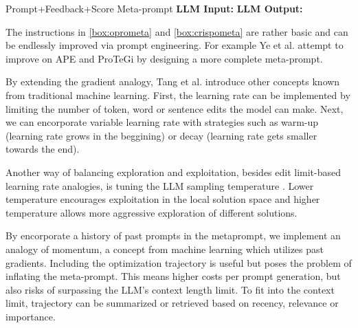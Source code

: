\begin{promptbox}
    [label={box:crispometa}]{Prompt+Feedback+Score Meta-prompt}
    \textbf{LLM Input:} 
    \textbf{LLM Output:} 
\end{promptbox}

The instructions in \ref{box:oprometa} and \ref{box:crispometa} are rather basic and can be endlessly
improved via prompt engineering. For example Ye et al.\cite{ye2024promptengineeringpromptengineer} attempt to 
improve on APE and ProTeGi by designing a more complete meta-prompt. 

By extending the gradient analogy, Tang et al.\cite{tang2024unleashingpotentiallargelanguage} introduce other concepts
known from traditional machine learning. First, the learning rate can be implemented by limiting the number of token, word or sentence edits the model
can make. Next, we can encorporate variable learning rate with strategies such as warm-up (learning rate grows in the beggining) or decay (learning rate
gets smaller towards the end).

Another way of balancing exploration and exploitation, besides edit limit-based learning rate analogies, is tuning the LLM sampling temperature . 
Lower temperature encourages exploitation in the local solution space and higher temperature allows 
more aggressive exploration of different solutions\cite{yang2024largelanguagemodelsoptimizers}.

By encorporate a history of past prompts in the metaprompt, we implement an analogy of momentum, a concept 
from machine learning which utilizes past gradients.
Including the optimization trajectory is useful but poses the problem of inflating the meta-prompt. 
This means higher costs per prompt generation, but also risks of surpassing the LLM's context length limit.
To fit into the context limit, trajectory can be summarized or retrieved based on recency, relevance or importance\cite{tang2024unleashingpotentiallargelanguage}.



